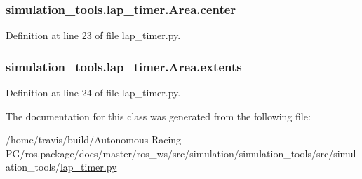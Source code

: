 \subsubsection[{\texorpdfstring{center}{center}}]{\setlength{\rightskip}{0pt plus 5cm}simulation\+\_\+tools.\+lap\+\_\+timer.\+Area.\+center}\hypertarget{classsimulation__tools_1_1lap__timer_1_1_area_ab6d54ce6f15f7931e2c97c418ef275ec}{}\label{classsimulation__tools_1_1lap__timer_1_1_area_ab6d54ce6f15f7931e2c97c418ef275ec}


Definition at line 23 of file lap\+\_\+timer.\+py.

\subsubsection[{\texorpdfstring{extents}{extents}}]{\setlength{\rightskip}{0pt plus 5cm}simulation\+\_\+tools.\+lap\+\_\+timer.\+Area.\+extents}\hypertarget{classsimulation__tools_1_1lap__timer_1_1_area_a5a876b3d7c79ddb803e0e66d851c8c4d}{}\label{classsimulation__tools_1_1lap__timer_1_1_area_a5a876b3d7c79ddb803e0e66d851c8c4d}


Definition at line 24 of file lap\+\_\+timer.\+py.



The documentation for this class was generated from the following file\+:\begin{DoxyCompactItemize}
\item 
/home/travis/build/\+Autonomous-\/\+Racing-\/\+P\+G/ros.\+package/docs/master/ros\+\_\+ws/src/simulation/simulation\+\_\+tools/src/simulation\+\_\+tools/\hyperlink{lap__timer_8py}{lap\+\_\+timer.\+py}\end{DoxyCompactItemize}
